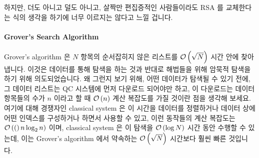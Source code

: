 하지만, 더도 아니고 덜도 아니고, 살짝만 편집증적인 사람들이라도 RSA 를
교체한다는 식의 생각을 하기에 너무 이르지는 않다고 느낄 겁니다.

\paragraph{Grover's Search Algorithm}
\label{sec:future:Grover's Search Algorithm}

Grover's algorithm 은 $N$ 항목의 순서잡히지 않은 리스트를 $\mathcal{O}\left(\sqrt N\right)$ 시간
안에 찾아냅니다.
이것은 데이터를 통해 탐색을 하는 것과 반대로 해법들을 위해 암묵적 탐색을 하기
위해 의도되었습니다.
왜 그런지 보기 위해, 어떤 데이터가 탐색될 수 있기 전에, 그 데이터 리스트는 QC
시스템에 먼저 다운로드 되어야만 하고, 이 다운로드는 데이터 항목들의 수가 $n$
이라고 할 때 $\mathcal{O}\left(n\right)$ 계산 복잡도를 가질 것이란 점을 생각해 보세요.
여기에 대해 경쟁자인 classical system 은 이 시간을 데이터를 정렬하거나 데이터
상에 어떤 인덱스를 구성하거나 하면서 사용할 수 있고, 이런 동작들의 계산
복잡도는 $\mathcal{O}\left((\right)n \log_2 n)$ 이며, classical system 은 이 탐색을 $\mathcal{O}\left(\log N\right)$ 시간
동안 수행할 수 있는데, 이는 Grover's algorithm 에서 약속하는 $\mathcal{O}\left(\sqrt N\right)$
시간보다 훨씬 빠른 것입니다.
\iffalse

